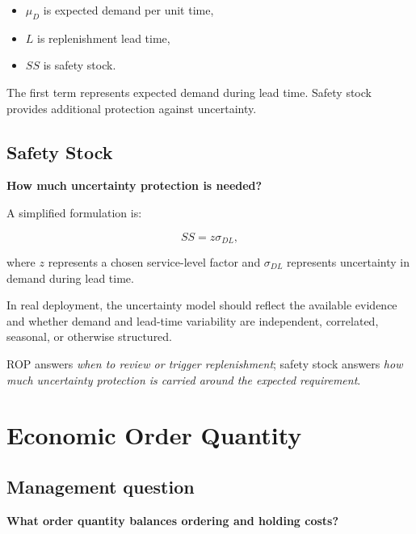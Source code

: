 \documentclass[11pt,a4paper]{article}
\begin{document}
\begin{itemize}
\item \(\mu_D\) is expected demand per unit time,
\item \(L\) is replenishment lead time,
\item \(SS\) is safety stock.
\end{itemize}

The first term represents expected demand during lead time. Safety stock
provides additional protection against uncertainty.

\subsection{Safety Stock}

\begin{principle}[Question]
\centering
\Large \textbf{How much uncertainty protection is needed?}
\end{principle}

A simplified formulation is:

\[
SS=z\sigma_{DL},
\]

where \(z\) represents a chosen service-level factor and
\(\sigma_{DL}\) represents uncertainty in demand during lead time.

In real deployment, the uncertainty model should reflect the available
evidence and whether demand and lead-time variability are independent,
correlated, seasonal, or otherwise structured.

\begin{keyidea}
ROP answers \emph{when to review or trigger replenishment}; safety stock answers
\emph{how much uncertainty protection is carried around the expected
requirement}.
\end{keyidea}

\section{Economic Order Quantity}

\subsection{Management question}

\begin{principle}[Question]
\centering
\Large \textbf{What order quantity balances ordering and holding costs?}
\end{principle}
\end{document}
